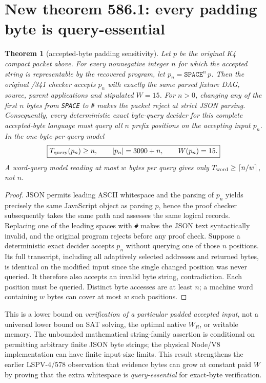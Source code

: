 \documentclass[11pt]{article}
\newtheorem{theorem}{Theorem}
\begin{document}
\section*{New theorem 586.1: every padding byte is query-essential}
\begin{theorem}[accepted-byte padding sensitivity]
Let $p$ be the original K4 compact packet above. For every nonnegative integer $n$ for which the accepted string is representable by the recovered program, let $p_n=\texttt{SPACE}^n\,p$. Then the original /341 checker accepts $p_n$ with exactly the same parsed fixture DAG, source, parent applications and stipulated $W=15$. For $n>0$, changing \emph{any} of the first $n$ bytes from \texttt{SPACE} to \texttt{\#} makes the packet reject at strict JSON parsing. Consequently, every \emph{deterministic exact} byte-query decider for this complete accepted-byte language must query all $n$ prefix positions on the \emph{accepting} input $p_n$. In the one-byte-per-query model
\[
\boxed{T_{\rm query}(p_n)\geq n,\qquad |p_n|=3090+n,\qquad W(p_n)=15.}
\]
A word-query model reading at most $w$ bytes per query gives only $T_{\rm word}\geq\lceil n/w\rceil$, not $n$.
\end{theorem}
\begin{proof}
JSON permits leading ASCII whitespace and the parsing of $p_n$ yields precisely the same JavaScript object as parsing $p$, hence the proof checker subsequently takes the same path and assesses the same logical records. Replacing one of the leading spaces with \texttt{\#} makes the JSON text syntactically invalid, and the original program rejects before any proof check. Suppose a deterministic exact decider accepts $p_n$ without querying one of those $n$ positions. Its full transcript, including all adaptively selected addresses and returned bytes, is identical on the modified input since the single changed position was never queried. It therefore also accepts an invalid byte string, contradiction. Each position must be queried. Distinct byte accesses are at least $n$; a machine word containing $w$ bytes can cover at most $w$ such positions. \end{proof}
\noindent This is a lower bound on \emph{verification of a particular padded accepted input}, not a universal lower bound on SAT solving, the optimal native $W_R$, or writable memory. The unbounded mathematical string-family assertion is conditional on permitting arbitrary finite JSON byte strings; the physical Node/V8 implementation can have finite input-size limits. This result strengthens the earlier LSPV-4/578 observation that evidence bytes can grow at constant paid $W$ by proving that the extra whitespace is \emph{query-essential} for exact-byte verification.
\end{document}
